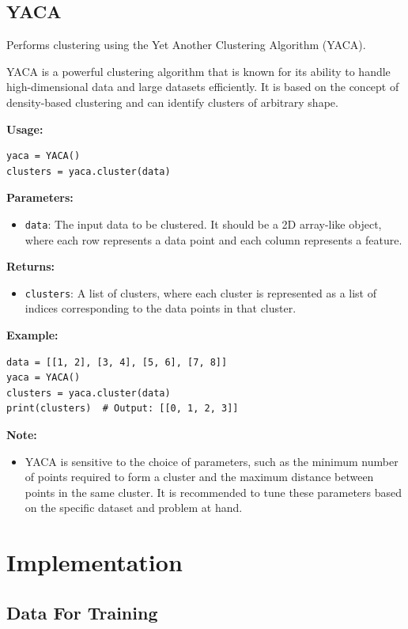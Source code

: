 \documentclass[openany]{report}
\begin{document}
\subsection{YACA}

Performs clustering using the Yet Another Clustering Algorithm (YACA).

YACA is a powerful clustering algorithm that is known for its ability to handle high-dimensional data and large datasets efficiently. It is based on the concept of density-based clustering and can identify clusters of arbitrary shape.

\textbf{Usage:}
\begin{verbatim}
yaca = YACA()
clusters = yaca.cluster(data)
\end{verbatim}

\textbf{Parameters:}
\begin{itemize}
    \item \texttt{data}: The input data to be clustered. It should be a 2D array-like object, where each row represents a data point and each column represents a feature.
\end{itemize}

\textbf{Returns:}
\begin{itemize}
    \item \texttt{clusters}: A list of clusters, where each cluster is represented as a list of indices corresponding to the data points in that cluster.
\end{itemize}

\textbf{Example:}
\begin{verbatim}
data = [[1, 2], [3, 4], [5, 6], [7, 8]]
yaca = YACA()
clusters = yaca.cluster(data)
print(clusters)  # Output: [[0, 1, 2, 3]]
\end{verbatim}

\textbf{Note:}
\begin{itemize}
    \item YACA is sensitive to the choice of parameters, such as the minimum number of points required to form a cluster and the maximum distance between points in the same cluster. It is recommended to tune these parameters based on the specific dataset and problem at hand.
\end{itemize}

\section{Implementation}

\subsection{Data For Training}
\end{document}
